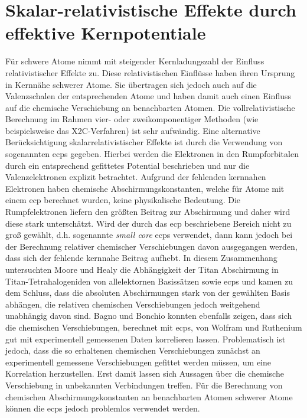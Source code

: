 \section{Skalar-relativistische Effekte durch effektive Kernpotentiale}\label{kap:ecps}
Für schwere Atome nimmt mit steigender Kernladungszahl der Einfluss relativistischer Effekte zu. Diese relativistischen Einflüsse haben ihren Ursprung in Kernnähe schwerer Atome. Sie übertragen sich jedoch auch auf die Valenzschalen der entsprechenden Atome und haben damit auch einen Einfluss auf die chemische Verschiebung an benachbarten Atomen. Die vollrelativistische Berechnung im Rahmen vier- oder zweikomponentiger Methoden (wie beispielsweise das X2C-Verfahren) ist sehr aufwändig. Eine alternative Berücksichtigung skalarrelativistischer Effekte ist durch die Verwendung von sogenannten \acp{ecp}\supercite{cundari1996effective,frenking2007pseudopotential} gegeben. Hierbei werden die Elektronen in den Rumpforbitalen durch ein entsprechend gefittetes Potential beschrieben und nur die Valenzelektronen explizit betrachtet. Aufgrund der fehlenden kernnahen Elektronen haben chemische Abschirmungskonstanten, welche für Atome mit einem \ac{ecp} berechnet wurden, keine physikalische Bedeutung. Die Rumpfelektronen liefern den größten Beitrag zur Abschirmung und daher wird diese stark unterschätzt. Wird der durch das \ac{ecp} beschriebene Bereich nicht zu groß gewählt, d.h. sogenannte \textit{small core} \acp{ecp} verwendet, dann kann jedoch bei der Berechnung relativer chemischer Verschiebungen davon ausgegangen werden, dass sich der fehlende kernnahe Beitrag aufhebt.\supercite{van2012use} In diesem Zusammenhang untersuchten Moore und Healy\supercite{moore1995ab} die Abhängigkeit der Titan Abschirmung in Titan-Tetrahalogeniden von allelektornen Basissätzen sowie \acp{ecp} und kamen zu dem Schluss, dass die absoluten Abschirmungen stark von der gewählten Basis abhängen, die relativen chemischen Verschiebungen jedoch weitgehend unabhängig davon sind. Bagno und Bonchio konnten ebenfalls zeigen, dass sich die chemischen Verschiebungen, berechnet mit \acp{ecp}, von Wolfram\supercite{bagno2000effective} und Ruthenium\supercite{bagno2002dft} gut mit experimentell gemessenen Daten korrelieren lassen. Problematisch ist jedoch, dass die so erhaltenen chemischen Verschiebungen zunächst an experimentell gemessene Verschiebungen gefittet werden müssen, um eine Korrelation herzustellen. Erst damit lassen sich Aussagen über die chemische Verschiebung in unbekannten Verbindungen treffen. Für die Berechnung von chemischen Abschirmungskonstanten an benachbarten Atomen schwerer Atome können die \acp{ecp} jedoch problemlos verwendet werden.
